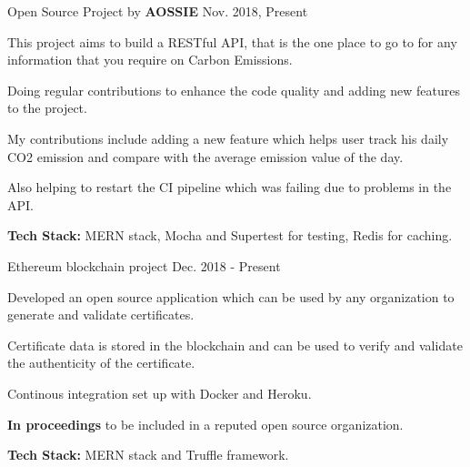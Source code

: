 


\begin{cventries}


  
  \cventry
  {Open Source Project by \textbf{AOSSIE}}
  {\href{https://gitlab.com/aossie/CarbonFootprint-API}{}{}}
  {}
  {Nov. 2018, Present}
  {
    \begin{cvitems}
      \item This project aims to build a RESTful API, that is the one place to go to for any information that you require on Carbon Emissions.
      \item Doing regular contributions to enhance the code quality and adding new features to the project.
      \item My contributions include adding a new feature which helps user track his daily CO2 emission and compare with the average emission value of the day.
      \item Also helping to restart the CI pipeline which was failing due to problems in the API.
      \item \textbf{Tech Stack:} MERN stack, Mocha and Supertest for testing, Redis for caching.
    \end{cvitems}
  }

  \cventry
  {Ethereum blockchain project}
  {\href{https://github.com/thakursaurabh1998/certification-validation}{}
    {}}
  {}
  {Dec. 2018 - Present}
  {
    \begin{cvitems}
      \item Developed an open source application which can be used by any organization to generate and validate certificates.
      \item Certificate data is stored in the blockchain and can be used to verify and validate the authenticity of the certificate.
      \item Continous integration set up with Docker and Heroku.
      \item \textbf{In proceedings} to be included in a reputed open source organization.
      \item \textbf{Tech Stack:} MERN stack and Truffle framework.
    \end{cvitems}
  }


\end{cventries}

